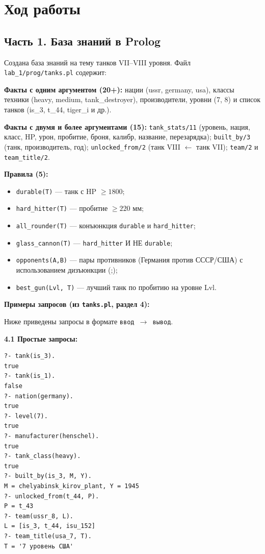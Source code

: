 \documentclass[12pt,a4paper]{article}
\begin{document}
\section{Ход работы}

\subsection{Часть 1. База знаний в Prolog}

Создана база знаний на тему танков VII--VIII уровня. Файл \texttt{lab\_1/prog/tanks.pl} содержит:

\textbf{Факты с одним аргументом (20+):} нации (ussr, germany, usa), классы техники (heavy, medium, tank\_destroyer), производители, уровни (7, 8) и список танков (is\_3, t\_44, tiger\_i и др.).

\textbf{Факты с двумя и более аргументами (15):} \texttt{tank\_stats/11} (уровень, нация, класс, HP, урон, пробитие, броня, калибр, название, перезарядка); \texttt{built\_by/3} (танк, производитель, год); \texttt{unlocked\_from/2} (танк VIII $\leftarrow$ танк VII); \texttt{team/2} и \texttt{team\_title/2}.

\textbf{Правила (5):}
\begin{itemize}
    \item \texttt{durable(T)} --- танк с HP $\geq 1800$;
    \item \texttt{hard\_hitter(T)} --- пробитие $\geq 220$ мм;
    \item \texttt{all\_rounder(T)} --- конъюнкция \texttt{durable} и \texttt{hard\_hitter};
    \item \texttt{glass\_cannon(T)} --- \texttt{hard\_hitter} И НЕ \texttt{durable};
    \item \texttt{opponents(A,B)} --- пары противников (Германия против СССР/США) с использованием дизъюнкции (;);
    \item \texttt{best\_gun(Lvl, T)} --- лучший танк по пробитию на уровне Lvl.
\end{itemize}

\textbf{Примеры запросов (из \texttt{tanks.pl}, раздел 4):}

Ниже приведены запросы в формате \texttt{ввод $\rightarrow$ вывод}.

\textbf{4.1 Простые запросы:}

\begin{lstlisting}[style=prolog,language={},numbers=none,frame=none,basicstyle=\ttfamily\small]
?- tank(is_3).
true
?- tank(is_1).
false
?- nation(germany).
true
?- level(7).
true
?- manufacturer(henschel).
true
?- tank_class(heavy).
true
?- built_by(is_3, M, Y).
M = chelyabinsk_kirov_plant, Y = 1945
?- unlocked_from(t_44, P).
P = t_43
?- team(ussr_8, L).
L = [is_3, t_44, isu_152]
?- team_title(usa_7, T).
T = '7 уровень США'
\end{lstlisting}
\end{document}
